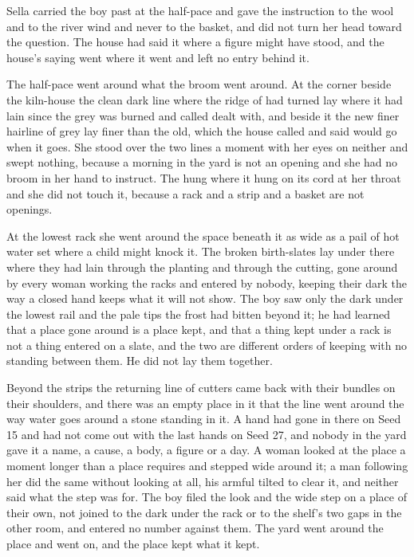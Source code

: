 Sella carried the boy past at the half-pace and gave the instruction to the wool and to the river wind and never to the basket, and did not turn her head toward the question. The house had said it where a figure might have stood, and the house's saying went where it went and left no entry behind it.

\scenebreak

The half-pace went around what the broom went around. At the corner beside the kiln-house the clean dark line where the ridge of  had turned lay where it had lain since the grey was burned and called dealt with, and beside it the new finer hairline of grey lay finer than the old, which the house called  and said would go when it goes. She stood over the two lines a moment with her eyes on neither and swept nothing, because a morning in the yard is not an opening and she had no broom in her hand to instruct. The  hung where it hung on its cord at her throat and she did not touch it, because a rack and a strip and a basket are not openings.

At the lowest rack she went around the space beneath it as wide as a pail of hot water set where a child might knock it. The broken birth-slates lay under there where they had lain through the planting and through the cutting, gone around by every woman working the racks and entered by nobody, keeping their dark the way a closed hand keeps what it will not show. The boy saw only the dark under the lowest rail and the pale tips the frost had bitten beyond it; he had learned that a place gone around is a place kept, and that a thing kept under a rack is not a thing entered on a slate, and the two are different orders of keeping with no standing between them. He did not lay them together.

Beyond the strips the returning line of cutters came back with their bundles on their shoulders, and there was an empty place in it that the line went around the way water goes around a stone standing in it. A hand had gone in there on Seed 15 and had not come out with the last hands on Seed 27, and nobody in the yard gave it a name, a cause, a body, a figure or a day. A woman looked at the place a moment longer than a place requires and stepped wide around it; a man following her did the same without looking at all, his armful tilted to clear it, and neither said what the step was for. The boy filed the look and the wide step on a place of their own, not joined to the dark under the rack or to the shelf's two gaps in the other room, and entered no number against them. The yard went around the place and went on, and the place kept what it kept.

